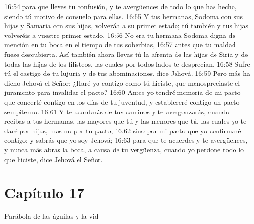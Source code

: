 16:54 para que lleves tu confusión, y te avergüences de todo lo que has hecho, siendo tú motivo de consuelo para ellas.   
16:55 Y tus hermanas, Sodoma con sus hijas y Samaria con sus hijas, volverán a su primer estado; tú también y tus hijas volveréis a vuestro primer estado.   
16:56 No era tu hermana Sodoma digna de mención en tu boca en el tiempo de tus soberbias,   
16:57 antes que tu maldad fuese descubierta. Así también ahora llevas tú la afrenta de las hijas de Siria y de todas las hijas de los filisteos, las cuales por todos lados te desprecian.   
16:58 Sufre tú el castigo de tu lujuria y de tus abominaciones, dice Jehová.   
16:59 Pero más ha dicho Jehová el Señor: ¿Haré yo contigo como tú hiciste, que menospreciaste el juramento para invalidar el pacto?   
16:60 Antes yo tendré memoria de mi pacto que concerté contigo en los días de tu juventud, y estableceré contigo un pacto sempiterno.   
16:61 Y te acordarás de tus caminos y te avergonzarás, cuando recibas a tus hermanas, las mayores que tú y las menores que tú, las cuales yo te daré por hijas, mas no por tu pacto,   
16:62 sino por mi pacto que yo confirmaré contigo; y sabrás que yo soy Jehová;   
16:63 para que te acuerdes y te avergüences, y nunca más abras la boca, a causa de tu vergüenza, cuando yo perdone todo lo que hiciste, dice Jehová el Señor.   
\section*{Capítulo 17  }
Parábola de las águilas y la vid 
  
